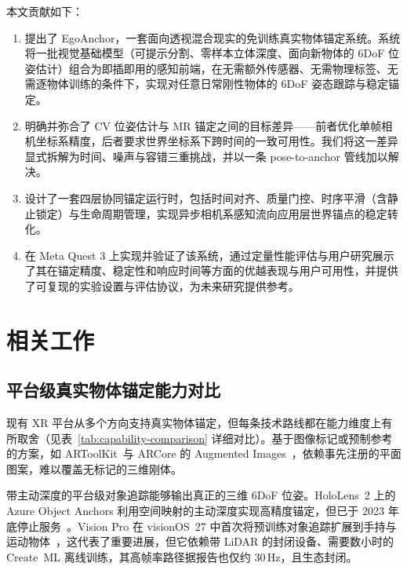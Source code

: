 \documentclass[review]{vgtc}
\begin{document}
本文贡献如下：
\begin{enumerate}
  \item 提出了 EgoAnchor，一套面向透视混合现实的免训练真实物体锚定系统。系统将一批视觉基础模型（可提示分割、零样本立体深度、面向新物体的 6DoF 位姿估计）组合为即插即用的感知前端，在无需额外传感器、无需物理标签、无需逐物体训练的条件下，实现对任意日常刚性物体的 6DoF 姿态跟踪与稳定锚定。
  \item 明确并弥合了 CV 位姿估计与 MR 锚定之间的目标差异——前者优化单帧相机坐标系精度，后者要求世界坐标系下跨时间的一致可用性。我们将这一差异显式拆解为时间、噪声与容错三重挑战，并以一条 pose-to-anchor 管线加以解决。
  \item 设计了一套四层协同锚定运行时，包括时间对齐、质量门控、时序平滑（含静止锁定）与生命周期管理，实现异步相机系感知流向应用层世界锚点的稳定转化。
  \item 在 Meta Quest 3 上实现并验证了该系统，通过定量性能评估与用户研究展示了其在锚定精度、稳定性和响应时间等方面的优越表现与用户可用性，并提供了可复现的实验设置与评估协议，为未来研究提供参考。
\end{enumerate}


\section{相关工作}

\subsection{平台级真实物体锚定能力对比}

现有 XR 平台从多个方向支持真实物体锚定，但每条技术路线都在能力维度上有所取舍（见表~\ref{tab:capability-comparison} 详细对比）。基于图像标记或预制参考的方案，如 ARToolKit~\cite{kato1999artoolkit}与 ARCore 的 Augmented Images~\cite{googleArcoreAugmentedImages}，依赖事先注册的平面图案，难以覆盖无标记的三维刚体。

带主动深度的平台级对象追踪能够输出真正的三维 6DoF 位姿。HoloLens~2 上的 Azure Object Anchors 利用空间映射的主动深度实现高精度锚定，但已于 2023 年底停止服务~\cite{azureObjectAnchors}。Vision Pro 在 visionOS~27 中首次将预训练对象追踪扩展到手持与运动物体~\cite{appleVisionOS27ObjectTracking}，这代表了重要进展，但它依赖带 LiDAR 的封闭设备、需要数小时的 Create~ML 离线训练，其高帧率路径据报告也仅约 30\,Hz，且生态封闭。
\end{document}
